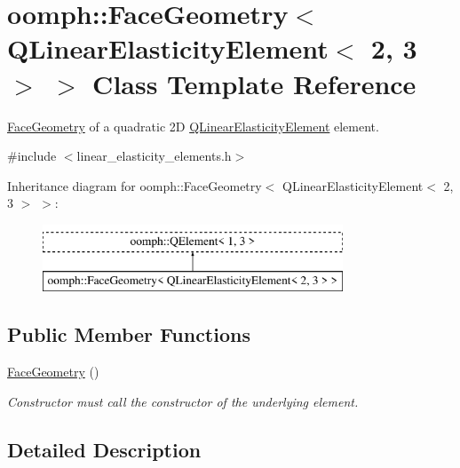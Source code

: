\hypertarget{classoomph_1_1FaceGeometry_3_01QLinearElasticityElement_3_012_00_013_01_4_01_4}{}\section{oomph\+:\+:Face\+Geometry$<$ Q\+Linear\+Elasticity\+Element$<$ 2, 3 $>$ $>$ Class Template Reference}
\label{classoomph_1_1FaceGeometry_3_01QLinearElasticityElement_3_012_00_013_01_4_01_4}


\hyperlink{classoomph_1_1FaceGeometry}{Face\+Geometry} of a quadratic 2D \hyperlink{classoomph_1_1QLinearElasticityElement}{Q\+Linear\+Elasticity\+Element} element.  




{\ttfamily \#include $<$linear\+\_\+elasticity\+\_\+elements.\+h$>$}

Inheritance diagram for oomph\+:\+:Face\+Geometry$<$ Q\+Linear\+Elasticity\+Element$<$ 2, 3 $>$ $>$\+:\begin{figure}[H]
\begin{center}
\leavevmode
\includegraphics[height=2.000000cm]{classoomph_1_1FaceGeometry_3_01QLinearElasticityElement_3_012_00_013_01_4_01_4}
\end{center}
\end{figure}
\subsection*{Public Member Functions}
\begin{DoxyCompactItemize}
\item 
\hyperlink{classoomph_1_1FaceGeometry_3_01QLinearElasticityElement_3_012_00_013_01_4_01_4_ae533b9537dfb4e2ee4c86ee0cdced813}{Face\+Geometry} ()
\begin{DoxyCompactList}\small\item\em Constructor must call the constructor of the underlying element. \end{DoxyCompactList}\end{DoxyCompactItemize}


\subsection{Detailed Description}
